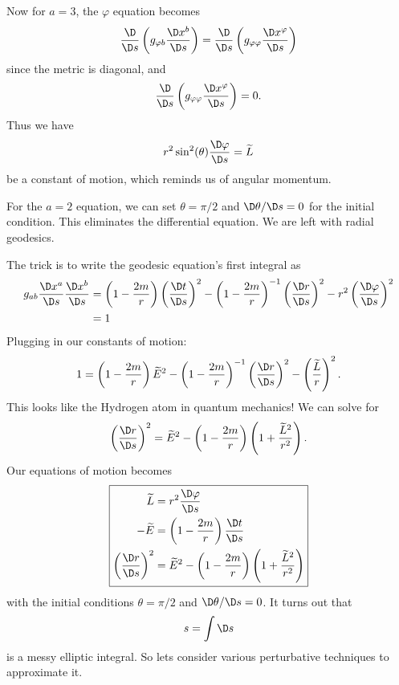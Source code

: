 Now for $a=3$, the $\varphi$ equation becomes
\begin{equation}
\frac{\D}{\D s}\left(g_{\varphi b}\frac{\D x^{b}}{\D s}\right)
=\frac{\D}{\D s}\left(g_{\varphi\varphi}\frac{\D x^{\varphi}}{\D s}\right)
\end{equation}
since the metric is diagonal, and
\begin{equation}
\frac{\D}{\D s}\left(g_{\varphi\varphi}\frac{\D x^{\varphi}}{\D s}\right)=0.
\end{equation}
Thus we have
\begin{equation}
r^{2}\sin^{2}(\theta)\frac{\D\varphi}{\D s}=\widetilde{L}
\end{equation}
be a constant of motion, which reminds us of angular momentum.

For the $a=2$ equation, we can set $\theta=\pi/2$ and
$\D\theta/\D s=0$ for the initial condition. This eliminates the
differential equation. We are left with radial geodesics.

The trick
is to write the geodesic equation's first integral as 
\begin{equation}
\begin{split}
g_{ab}\frac{\D x^{a}}{\D s}\frac{\D x^{b}}{\D s} &=
\left(1-\frac{2m}{r}\right)\left(\frac{\D t}{\D s}\right)^{2}
-\left(1-\frac{2m}{r}\right)^{-1}\left(\frac{\D r}{\D s}\right)^{2}
-r^{2}\left(\frac{\D\varphi}{\D s}\right)^{2}\\
&=1
\end{split}
\end{equation}
Plugging in our constants of motion:
\begin{equation}
1=\left(1-\frac{2m}{r}\right)\widetilde{E}^{2}
-\left(1-\frac{2m}{r}\right)^{-1}\left(\frac{\D r}{\D s}\right)^{2}
-\left(\frac{\widetilde{L}}{r}\right)^{2}.
\end{equation}
This looks like the Hydrogen atom in quantum mechanics! We can
solve for
\begin{equation}
\left(\frac{\D r}{\D s}\right)^{2}=
\widetilde{E}^{2}-\left(1-\frac{2m}{r}\right)
\left(1+\frac{\widetilde{L}^{2}}{r^{2}}\right).
\end{equation}
Our equations of motion becomes
\begin{equation}
\boxed{
\begin{aligned}
\widetilde{L} &=r^{2}\frac{\D\varphi}{\D s}\\
-\widetilde{E} &= \left(1-\frac{2m}{r}\right)\frac{\D t}{\D s}\\
\left(\frac{\D r}{\D s}\right)^{2} &=
\widetilde{E}^{2}-\left(1-\frac{2m}{r}\right)
\left(1+\frac{\widetilde{L}^{2}}{r^{2}}\right)
\end{aligned}
}
\end{equation}
with the initial conditions $\theta=\pi/2$ and $\D\theta/\D
s=0$. It turns out that
\begin{equation}
s=\int\D s
\end{equation}
is a messy elliptic integral. So lets consider various
perturbative techniques to approximate it.

